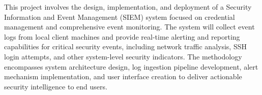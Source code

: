 This project involves the design, implementation, and deployment of a Security Information and Event Management (SIEM) system focused on credential management and comprehensive event monitoring. The system will collect event logs from local client machines and provide real-time alerting and reporting capabilities for critical security events, including network traffic analysis, SSH login attempts, and other system-level security indicators. The methodology encompasses system architecture design, log ingestion pipeline development, alert mechanism implementation, and user interface creation to deliver actionable security intelligence to end users.

